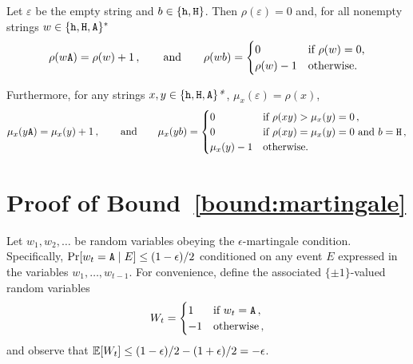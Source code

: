 \begin{theorem*}
  Let $\varepsilon$ be the empty string 
  and $b \in \{\mathtt{h}, \mathtt{H}\}$. 
  Then $\rho(\varepsilon) = 0$ 
  and, for all nonempty strings $w \in \{\mathtt{h}, \mathtt{H}, \mathtt{A}\}^*$ 
  \begin{equation*}
    \rho(w\mathtt{A}) = \rho(w) + 1\,, \qquad\text{and}\qquad
    \rho(wb) = \begin{cases} 0 & \text{if $\rho(w) = 0$,}\\
      \rho(w)-1 & \text{otherwise.}
    \end{cases}
  \end{equation*}


  Furthermore, for any strings $x, y \in\{\mathtt{h}, \mathtt{H}, \mathtt{A}\}\text{\emph{*}}$,
  $\mu_x(\varepsilon) =\rho(x)$, 
  \begin{equation*}
    \mu_x(y\mathtt{A})= \mu_x(y)+1\,,\qquad\text{and}\qquad
    \mu_x(yb)= \begin{cases}
      0 & \text{if $\rho(xy) > \mu_x(y)=0$}\,, \\
      0 & \text{if $\rho(xy) = \mu_x(y) = 0$ and $b = \mathtt{H}$}\,, \\
      \mu_x(y)-1 & \text{otherwise.}
    \end{cases}
  \end{equation*}  
\end{theorem*}




\section{Proof of Bound~\ref{bound:martingale} }
  Let $w_1, w_2, \ldots$ be random variables obeying the
  $\epsilon$-martingale condition.  Specifically,
  $\Pr[w_t = \mathtt{A} \mid E] \leq (1 - \epsilon)/2$ conditioned on any event
  $E$ expressed in the variables $w_1, \ldots, w_{t-1}$.  For
  convenience, define the associated $\{\pm1\}$-valued random
  variables 
  $$
    W_t = \begin{cases}
      1 &   \text{if $w_t = \mathtt{A}$}\,, \\
      -1 &  \text{otherwise}\,, 
    \end{cases}
    $$ and observe that
  $\operatorname{\mathbb{E}}[W_t]  \leq (1-\epsilon)/2 - (1+\epsilon)/2 = -\epsilon$.


